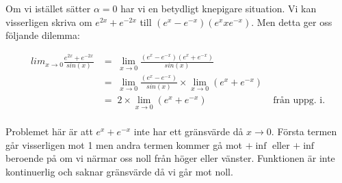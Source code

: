\documentclass[a4paper, 11pt]{article}
\begin{document}
Om vi istället sätter $\alpha = 0$ har vi en betydligt knepigare
situation. Vi kan visserligen skriva om $e^{2x} + e^{-2x}$ till
$(e^x - e^{-x})(e^x x e^{-x})$. Men detta ger oss följande dilemma:

\begin{align*}
  lim_{x \rightarrow 0}\frac{e^{2x} + e^{-2x}}{sin(x)} 
      &=\; \lim_{x \rightarrow 0}\frac{(e^x - e^{-x})(e^x + e^{-x})}{sin(x)} \\
      &=\; \lim_{x \rightarrow 0}\frac{(e^x - e^{-x})}{sin(x)} \times \lim_{x \rightarrow 0}(e^x + e^{-x}) \\
      &=\; 2 \times \lim_{x \rightarrow 0}(e^x + e^{-x}) &\; \text{från uppg. i}.\\  
\end{align*}

Problemet här är att $e^x + e^{-x}$ inte har ett gränsvärde då
$x \rightarrow 0$. Första termen går visserligen mot 1 men andra
termen kommer gå mot $+\inf$ eller $+\inf$ beroende på om vi närmar
oss noll från höger eller vänster. Funktionen är inte kontinuerlig och
saknar gränsvärde då vi går mot noll.
\end{document}
